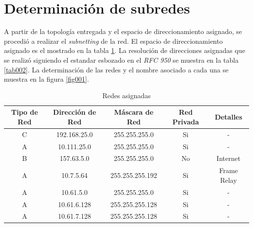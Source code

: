 \section{Determinación de subredes}
A partir de la topología entregada y el espacio de direccionamiento asignado, se procedió a realizar el \textit{subnetting} de la red. El espacio 
de direccionamiento asignado es el mostrado en la tabla \ref{tab001}. La resolución de direcciones asignadas que se realizó siguiendo el estandar
esbozado en el \textit{RFC 950} se muestra en la tabla \ref{tab002}. La determinación de las redes y el nombre asociado a cada una se muestra en 
la figura \ref{fig001}. \\

\begin{table}[!htpb]
	\centering
	\begin{tabular}{|c|c|c|c|c|}
		\hline
		Tipo de Red & Dirección de Red & Máscara de Red & Red Privada & Detalles \\
		\hline
		C & 192.168.25.0 & 255.255.255.0 & Si & - \\
		\hline
		A & 10.111.25.0 & 255.255.255.0 & Si & - \\
		\hline
		B & 157.63.5.0 & 255.255.255.0 & No & Internet \\
		\hline
		A & 10.7.5.64 & 255.255.255.192 & Si & Frame Relay \\
		\hline
		A & 10.61.5.0 & 255.255.255.0 & Si & - \\
		\hline
		A & 10.61.6.128 & 255.255.255.128 & Si & - \\
		\hline
		A & 10.61.7.128 & 255.255.255.128 & Si & - \\
		\hline
	\end{tabular}
	\caption{Redes asignadas}
	\label{tab001}
\end{table}
		
